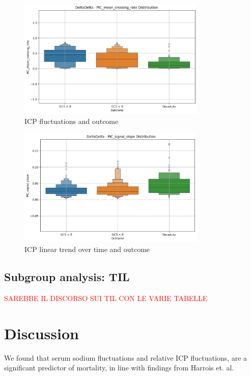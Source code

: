 \begin{figure}[h!]
    \centering
    \includegraphics[width=0.8\textwidth]{pictures/fig10_ICPfluctuations.png}
    \caption{ICP fluctuations and outcome} %
    \label{fig:ICPfluctuations_outcome} %
\end{figure}

\begin{figure}[h!]
    \centering
    \includegraphics[width=0.8\textwidth]{pictures/fig11_ICPslope.png}
    \caption{ICP linear trend over time and outcome} %
    \label{fig:ICPslope_outcome} %
\end{figure}


\subsection{Subgroup analysis: TIL}
\textcolor{red}{SAREBBE IL DISCORSO SUI TIL CON LE VARIE TABELLE}


\section{Discussion}
We found that  serum sodium fluctuations and relative ICP fluctuations, are a significant predictor of mortality, in line with findings from Harrois et. al.\cite{harroisVariabilitySerumSodium2021a}

